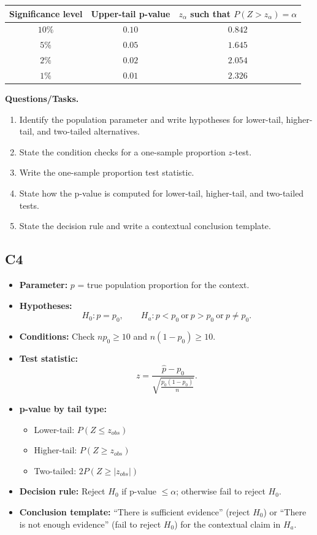 \begin{center}
	\renewcommand{\arraystretch}{1.3}
	\begin{tabular}{|c|c|c|}
		\hline
		\textbf{Significance level} & \textbf{Upper-tail p-value} & \textbf{\(z_\alpha\) such that \(P(Z>z_\alpha)=\alpha\)} \\
		\hline
		\(10\%\) & \(0.10\) & \(0.842\) \\
		\hline
		\(5\%\) & \(0.05\) & \(1.645\) \\
		\hline
		\(2\%\) & \(0.02\) & \(2.054\) \\
		\hline
		\(1\%\) & \(0.01\) & \(2.326\) \\
		\hline
	\end{tabular}
\end{center}

\textbf{Questions/Tasks.}
\begin{enumerate}
	\item[(a)] Identify the population parameter and write hypotheses for lower-tail, higher-tail, and two-tailed alternatives.
	\item[(b)] State the condition checks for a one-sample proportion \(z\)-test.
	\item[(c)] Write the one-sample proportion test statistic.
	\item[(d)] State how the p-value is computed for lower-tail, higher-tail, and two-tailed tests.
	\item[(e)] State the decision rule and write a contextual conclusion template.
\end{enumerate}

\subsection*{C4}
\begin{itemize}
	\item \textbf{Parameter:} \(p\) = true population proportion for the context.
	\item \textbf{Hypotheses:}
	\[
	H_0\colon p=p_0,\qquad
	H_a\colon p<p_0\ \text{or}\ p>p_0\ \text{or}\ p\ne p_0.
	\]
	\item \textbf{Conditions:} Check \(np_0\ge 10\) and \(n(1-p_0)\ge 10\).
	\item \textbf{Test statistic:}
	\[
	z=\frac{\hat p-p_0}{\sqrt{\frac{p_0(1-p_0)}{n}}}.
	\]
	\item \textbf{p-value by tail type:}
	\begin{itemize}
		\item Lower-tail: \(P(Z\le z_{obs})\)
		\item Higher-tail: \(P(Z\ge z_{obs})\)
		\item Two-tailed: \(2P(Z\ge |z_{obs}|)\)
	\end{itemize}
	\item \textbf{Decision rule:} Reject \(H_0\) if p-value \(\le \alpha\); otherwise fail to reject \(H_0\).
	\item \textbf{Conclusion template:} ``There is sufficient evidence'' (reject \(H_0\)) or ``There is not enough evidence'' (fail to reject \(H_0\)) for the contextual claim in \(H_a\).
\end{itemize}

